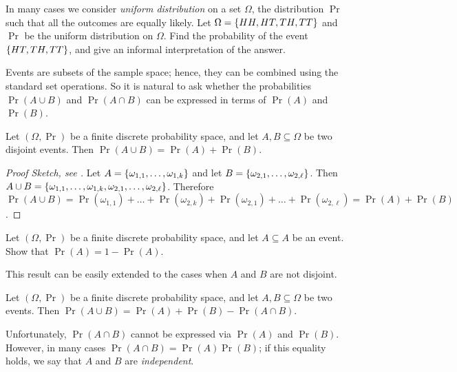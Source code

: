 \begin{exercise}
  In many cases we consider \emph{uniform distribution} on a set $\Omega$, the
  distribution $\Pr$ such that all the outcomes are equally likely.
  Let $\Omega = \set{HH, HT, TH, TT}$ and $\Pr$ be the uniform distribution on
  $\Omega$. Find the probability of the event $\set{HT, TH, TT}$, and give an
  informal interpretation of the answer.
\end{exercise}

Events are subsets of the sample space; hence, they can be combined using the
standard set operations. So it is natural to ask whether the probabilities
$\Pr(A \cup B)$ and $\Pr(A \cap B)$ can be expressed in terms of $\Pr(A)$ and
$\Pr(B)$.

\begin{theorem}
  Let $(\Omega, \Pr)$ be a finite discrete probability space, and let $A, B
  \subseteq \Omega$ be two disjoint events. Then 
  $\Pr(A \cup B) = \Pr(A) + \Pr(B)$.
\end{theorem}
\begin{proof}[Proof Sketch, see ]
  Let $A = \set{\omega_{1, 1}, \dots, \omega_{1, k}}$ and 
  let $B = \set{\omega_{2, 1}, \dots, \omega_{2, \ell}}$. 
  Then $A \cup B = \set{\omega_{1, 1}, \dots, \omega_{1, k}, 
    \omega_{2, 1}, \dots, \omega_{2, \ell}}$.
  Therefore $\Pr(A \cup B) = 
    \Pr(\omega_{1, 1}) + \dots + \Pr(\omega_{2, k}) +
    \Pr(\omega_{2, 1}) + \dots + \Pr(\omega_{2, \ell}) = \Pr(A) + \Pr(B)$.
\end{proof}

\begin{exercise}
  Let $(\Omega, \Pr)$ be a finite discrete probability space, and let $A
  \subseteq A$ be an event. Show that $\Pr(A) = 1 - \Pr(A)$.
\end{exercise}

This result can be easily extended to the cases when $A$ and $B$ are not
disjoint.
\begin{corollary}
\label{corollary:inclusion-exclusion-probability}
  Let $(\Omega, \Pr)$ be a finite discrete probability space, and let $A, B
  \subseteq \Omega$ be two events. Then 
  $\Pr(A \cup B) = \Pr(A) + \Pr(B) - \Pr(A \cap B)$.
\end{corollary}

Unfortunately, $\Pr(A \cap B)$ cannot be expressed via $\Pr(A)$ and $\Pr(B)$.
However, in many cases $\Pr(A \cap B) = \Pr(A) \Pr(B)$; if this equality holds,
we say that $A$ and $B$ are \emph{independent}.

